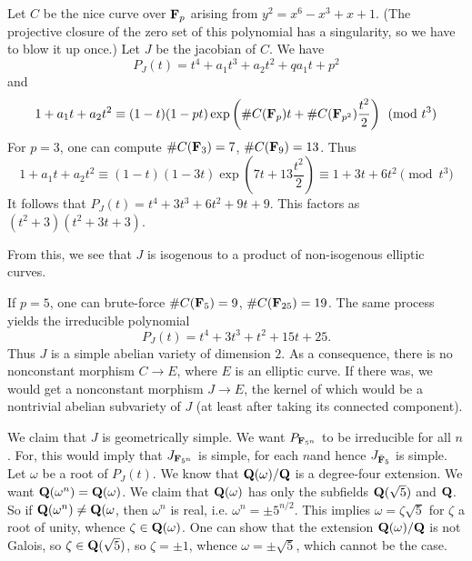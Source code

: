 \begin{example}
Let $C$ be the nice curve over $\mathbf{F}_p$ arising from 
$y^2=x^6-x^3+x+1$. (The projective closure of the zero set of this polynomial 
has a singularity, so we have to blow it up once.) 
Let $J$ be the jacobian of $C$. We have 
\[
  P_J(t) = t^4 + a_1 t^3 + a_2 t^2 + q a_1 t + p^2 
\]
and 
\[
  1+a_1 t + a_2 t^2 \equiv (1-t)(1-p t)\exp\left(\# C(\mathbf{F}_p)t + \# C(\mathbf{F}_{p^2}) \frac{t^2}{2}\right) \pmod{t^3}
\]
For $p=3$, one can compute $\# C(\mathbf{F}_3) = 7$, $\# C(\mathbf{F}_9) = 13$. Thus 
\[
  1+a_1 t + a_2 t^2 \equiv (1-t)(1-3 t)\exp\left(7 t+13\frac{t^2}{2}\right) \equiv 1+3 t+6 t^2 \pmod{t^3}
\]
It follows that $P_J(t) = t^4+3 t^3+6 t^2 + 9 t+9$. This factors as 
$(t^2+3)(t^2+3 t+3)$. 

From this, we see that $J$ is isogenous to a product of non-isogenous elliptic 
curves. 

If $p=5$, one can brute-force $\# C(\mathbf{F}_5) = 9$, $\# C(\mathbf{F}_{25}) = 19$. The 
same process yields the irreducible polynomial 
\[
  P_J(t) = t^4 + 3 t^3 + t^2 + 15 t + 25 \text{.}
\]
Thus $J$ is a simple abelian variety of dimension $2$. As a consequence, there 
is no nonconstant morphism $C\to E$, where $E$ is an elliptic curve. If there 
was, we would get a nonconstant morphism $J\to E$, the kernel of which would be 
a nontrivial abelian subvariety of $J$ (at least after taking its connected 
component). 

We claim that $J$ is geometrically simple. We want $P_{\mathbf{F}_{5^n}}$ to be 
irreducible for all $n$. For, this would imply that $J_{\mathbf{F}_{5^n}}$ is simple, 
for each $n$and hence $J_{\bar{\mathbf{F}}_5}$ is simple. Let $\omega$ be a root of 
$P_J(t)$. We know that $\mathbf{Q}(\omega)/\mathbf{Q}$ is a degree-four extension. We 
want $\mathbf{Q}(\omega^n) = \mathbf{Q}(\omega)$. We claim that 
$\mathbf{Q}(\omega)$ has only the subfields $\mathbf{Q}(\sqrt 5)$ and $\mathbf{Q}$. So if 
$\mathbf{Q}(\omega^n)\ne\mathbf{Q}(\omega$, then $\omega^n$ is real, i.e. 
$\omega^n=\pm 5^{n/2}$. This implies $\omega=\zeta\sqrt 5$ for $\zeta$ a 
root of unity, whence $\zeta\in \mathbf{Q}(\omega)$. One can show that the 
extension $\mathbf{Q}(\omega)/\mathbf{Q}$ is not Galois, so 
$\zeta\in \mathbf{Q}(\sqrt 5)$, so $\zeta=\pm 1$, whence 
$\omega = \pm \sqrt 5$, which cannot be the case. 
\end{example}


